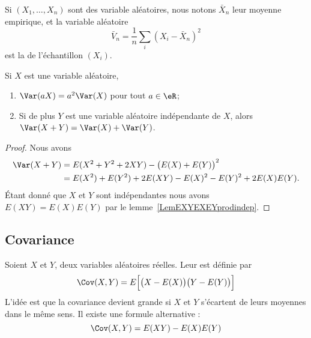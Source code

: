 \begin{definition}
	Si \( (X_1,\ldots,X_n)\) sont des variable aléatoires, nous notons \( \bar X_n\) leur moyenne empirique, et la variable aléatoire
	\begin{equation}
		\bar V_n=\frac{1}{ n }\sum_i(X_i-\bar X_n)^2
	\end{equation}
	est la  de l'échantillon \( (X_i)\).
\end{definition}

\begin{lemma}       \label{LemEXYEXEYindep}
	Si \( X\) est une variable aléatoire,
	\begin{enumerate}
		\item
		      \( \Var(aX)=a^2\Var(X)\) pour tout \( a\in\eR\);
		\item
		      Si de plus \( Y\) est une variable aléatoire indépendante de \( X\), alors \( \Var(X+Y)=\Var(X)+\Var(Y)\).
	\end{enumerate}
\end{lemma}

\begin{proof}
	Nous avons
	\begin{subequations}
		\begin{align}
			\Var(X+Y) & =E(X^2+Y^2+2XY)-\big( E(X)+E(Y) \big)^2        \\
			          & =E(X^2)+E(Y^2)+2E(XY)-E(X)^2-E(Y)^2+2E(X)E(Y).
		\end{align}
	\end{subequations}
	Étant donné que \( X\) et \( Y\) sont indépendantes nous avons \( E(XY)=E(X)E(Y)\) par le lemme~\ref{LemEXYEXEYprodindep}.
\end{proof}


\subsection{Covariance}

Soient \( X\) et \( Y\), deux variables aléatoires réelles. Leur  est définie par
\begin{equation}    \label{EqHUWtttN}
	\Cov(X,Y)=E\Big[ \big( X-E(X) \big)\big( Y-E(Y) \big) \Big]
\end{equation}
L'idée est que la covariance devient grande si \( X\) et \( Y\) s'écartent de leurs moyennes dans le même sens. Il existe une formule alternative :
\begin{equation}
	\Cov(X,Y)=E(XY)-E(X)E(Y)
\end{equation}

